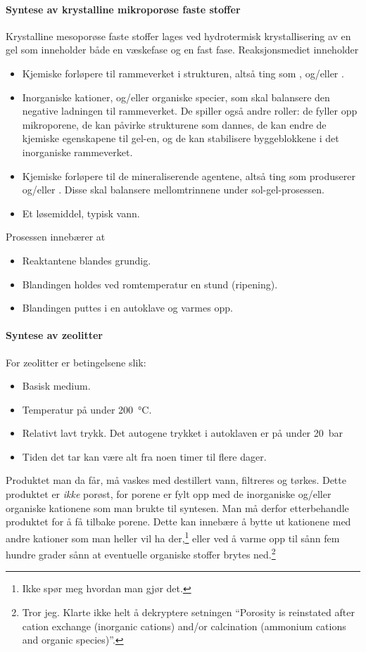 \paragraph{Syntese av krystalline mikroporøse faste stoffer}
Krystalline mesoporøse faste stoffer lages ved hydrotermisk krystallisering av en gel som inneholder både en væskefase og en fast fase. Reaksjonsmediet inneholder
\begin{itemize}
	\item Kjemiske forløpere til rammeverket i strukturen, altså ting som ,  og/eller .
	\item Inorganiske kationer, og/eller organiske specier, som skal balansere den negative ladningen til rammeverket. De spiller også andre roller: de fyller opp mikroporene, de kan påvirke strukturene som dannes, de kan endre de kjemiske egenskapene til gel-en, og de kan stabilisere byggeblokkene i det inorganiske rammeverket.
	\item Kjemiske forløpere til de mineraliserende agentene, altså ting som produserer  og/eller . Disse skal balansere mellomtrinnene under sol-gel-prosessen.
	\item Et løsemiddel, typisk vann.
\end{itemize}

Prosessen innebærer at
\begin{itemize}
	\item Reaktantene blandes grundig.
	\item Blandingen holdes ved romtemperatur en stund (ripening).
	\item Blandingen puttes i en autoklave og varmes opp.
\end{itemize}

\paragraph{Syntese av zeolitter} For zeolitter er betingelsene slik:
\begin{itemize}
	\item Basisk medium.
	\item Temperatur på under \SI{200}{\celsius}.
	\item Relativt lavt trykk. Det autogene trykket i autoklaven er på under \SI{20}{\bar}
	\item Tiden det tar kan være alt fra noen timer til flere dager.
\end{itemize} 
Produktet man da får, må vaskes med destillert vann, filtreres og tørkes. Dette produktet er \emph{ikke} porøst, for porene er fylt opp med de inorganiske og/eller organiske kationene som man brukte til syntesen. Man må derfor etterbehandle produktet for å få tilbake porene. Dette kan innebære å bytte ut kationene med andre kationer som man heller vil ha der,\footnote{Ikke spør meg hvordan man gjør det.} eller ved å varme opp til sånn fem hundre grader sånn at eventuelle organiske stoffer brytes ned.\footnote{Tror jeg. Klarte ikke helt å dekryptere setningen ``Porosity is reinstated after cation exchange (inorganic cations) and/or calcination (ammonium cations and organic species)''.}

